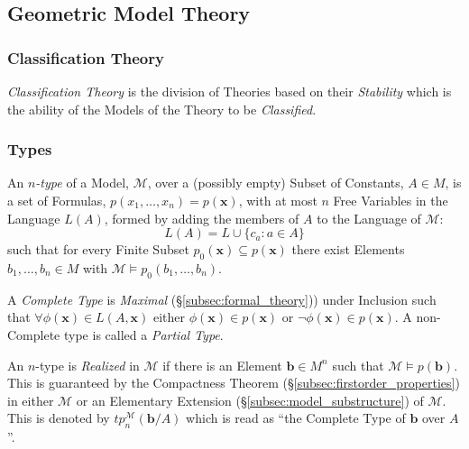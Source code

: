 \cite{harizanov98}

\subsection{Geometric Model Theory}

\subsubsection{Classification Theory}

\emph{Classification Theory} is the division of Theories based on
their \emph{Stability} which is the ability of the Models of the
Theory to be \emph{Classified}.

\subsubsection{Types}

An \emph{$n$-type} of a Model, $\mathcal{M}$, over a (possibly empty)
Subset of Constants, $A \in M$, is a set of Formulas,
$p(x_1,\ldots,x_n) = p(\mathbf{x})$, with at most $n$ Free Variables
in the Language $L(A)$, formed by adding the members of $A$ to the
Language of $\mathcal{M}$:
\[
    L(A) = L \cup \{ c_a : a \in A \}
\]
such that for every Finite Subset $p_0(\mathbf{x}) \subseteq
p(\mathbf{x})$ there exist Elements $b_1,\ldots,b_n \in M$ with
$\mathcal{M} \vDash p_0(b_1,\ldots,b_n)$.

A \emph{Complete Type} is \emph{Maximal}
(\S\ref{subsec:formal_theory})) under Inclusion such that $\forall
\phi(\mathbf{x}) \in L(A,\mathbf{x})$ either $\phi(\mathbf{x}) \in
p(\mathbf{x})$ or $\neg \phi(\mathbf{x}) \in p(\mathbf{x})$. A
non-Complete type is called a \emph{Partial Type}.

An $n$-type is \emph{Realized} in $\mathcal{M}$ if there is an Element
$\mathbf{b} \in M^n$ such that $\mathcal{M} \vDash
p(\mathbf{b})$. This is guaranteed by the Compactness Theorem
(\S\ref{subsec:firstorder_properties}) in either $\mathcal{M}$ or an
Elementary Extension (\S\ref{subsec:model_substructure}) of
$\mathcal{M}$. This is denoted by $tp_{n}^{\mathcal{M}}(\mathbf{b}/A)$
which is read as ``the Complete Type of $\mathbf{b}$ over $A$''.

